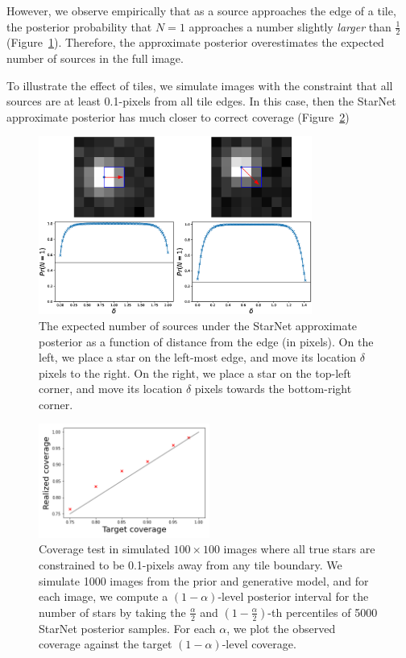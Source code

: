 However, we observe empirically that as a source approaches the edge of a tile,
the posterior probability that $N = 1$ approaches a number
slightly \textit{larger} than $\frac{1}{2}$ (Figure~\ref{fig:starnet_edges}).
Therefore, the approximate posterior overestimates the expected number of sources in the full image.

To illustrate the effect of tiles, we simulate images with the constraint that all sources are at least 0.1-pixels from all tile edges. 
In this case, then the StarNet approximate posterior has much closer to correct coverage (Figure~\ref{fig:coverage_good})

\begin{figure}[tb]
    \centering
    \includegraphics[width=0.8\textwidth]{./figures_vg/coverage/edges_example.eps}
    \caption{The expected number of sources under the StarNet approximate posterior as a function of distance from the edge (in pixels).
    On the left, we place a star on the left-most edge, and move its location $\delta$ pixels to the right.
    On the right, we place a star on the top-left corner, and move its location $\delta$ pixels towards the bottom-right corner.}
    \label{fig:starnet_edges}
\end{figure}

\begin{figure}[tb]
    \centering
    \includegraphics[width=0.5\textwidth]{./figures/coverage/good_coverage.png}
    \caption{Coverage test in simulated $100\times100$ images where all true stars are constrained to be 0.1-pixels away from any tile
    boundary.
    We simulate 1000 images from the prior and generative model, and for each image, we compute a $(1 - \alpha)$-level posterior interval for the number of stars by taking the $\frac{\alpha}{2}$ and $(1 -\frac{\alpha}{2})$-th percentiles of 5000 StarNet posterior samples.
    For each $\alpha$, we plot the observed coverage against the target $(1 - \alpha)$-level coverage. }
    \label{fig:coverage_good}
\end{figure}

